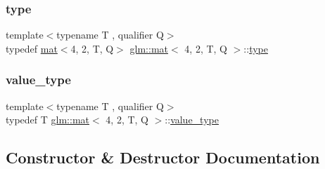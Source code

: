 \mbox{\label{structglm_1_1mat_3_014_00_012_00_01_t_00_01_q_01_4_aecca78e9fbf467c7558b6018401c3f29}} 
\subsubsection{\texorpdfstring{type}{type}}
{\footnotesize\ttfamily template$<$typename T , qualifier Q$>$ \\
typedef \hyperlink{structglm_1_1mat}{mat}$<$4, 2, T, Q$>$ \hyperlink{structglm_1_1mat}{glm\+::mat}$<$ 4, 2, T, Q $>$\+::\hyperlink{structglm_1_1mat_3_014_00_012_00_01_t_00_01_q_01_4_aecca78e9fbf467c7558b6018401c3f29}{type}}

\mbox{\label{structglm_1_1mat_3_014_00_012_00_01_t_00_01_q_01_4_aad6b55a7bcab7ce036cd5d5f5b963c6e}} 
\subsubsection{\texorpdfstring{value\+\_\+type}{value\_type}}
{\footnotesize\ttfamily template$<$typename T , qualifier Q$>$ \\
typedef T \hyperlink{structglm_1_1mat}{glm\+::mat}$<$ 4, 2, T, Q $>$\+::\hyperlink{structglm_1_1mat_3_014_00_012_00_01_t_00_01_q_01_4_aad6b55a7bcab7ce036cd5d5f5b963c6e}{value\+\_\+type}}



\subsection{Constructor \& Destructor Documentation}
\mbox{\label{structglm_1_1mat_3_014_00_012_00_01_t_00_01_q_01_4_ad00ae33ce233ac098c9d6ff11fe709a7}} 
